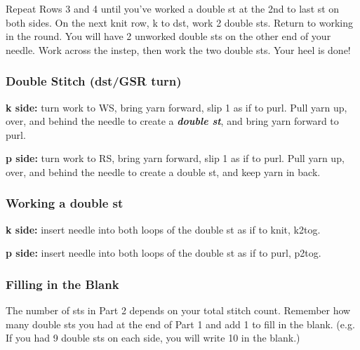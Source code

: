 \documentclass[12pt]{article}
\newcommand{\vocab}[1]{\emph{\textbf{#1}}} %
\newcommand{\rowDir}[1]{\textbf{#1:}} %
\newenvironment{frnote}
    {%
    	\setlength{\FrameRule}{1.5pt}
    	\def\FrameCommand{\fboxrule=\FrameRule\fboxsep=\FrameSep \fcolorbox{framecolor}{shadecolor}}
    	\MakeFramed {\FrameRestore}}
    {\setlength{\FrameRule}{1pt}
	\endMakeFramed}
\begin{document}
\begin{multicols}{2}
Repeat Rows 3 and 4 until you've worked a double st at the 2nd to last st on both sides. On the next knit row, k to dst, work 2 double sts. Return to working in the round. You will have 2 unworked double sts on the other end of your needle. Work across the instep, then work the two double sts. Your heel is done!

\vfill
\columnbreak

\begin{frnote} \vspace{-1em}
\subsubsection*{Double Stitch (dst/GSR turn)}
\rowDir{k side} turn work to WS, bring yarn forward, slip 1 as if to purl. Pull yarn up, over, and behind the needle to create a \vocab{double st}, and bring yarn forward to purl.

\rowDir{p side} turn work to RS, bring yarn forward, slip 1 as if to purl. Pull yarn up, over, and behind the needle to create a double st, and keep yarn in back.
\end{frnote}

\vspace{2em}

\begin{frnote} \vspace{-1em}
\subsubsection*{Working a double st}
\rowDir{k side} insert needle into both loops of the double st as if to knit, k2tog.

\rowDir{p side} insert needle into both loops of the double st as if to purl, p2tog.
\end{frnote}

\begin{frnote} \vspace{-1em}
\subsubsection*{Filling in the Blank}
The number of sts in Part 2 depends on your total stitch count. Remember how many double sts you had at the end of Part 1 and add 1 to fill in the blank. (e.g. If you had 9 double sts on each side, you will write 10 in the blank.)
\end{frnote}

\end{multicols}

\end{document}
